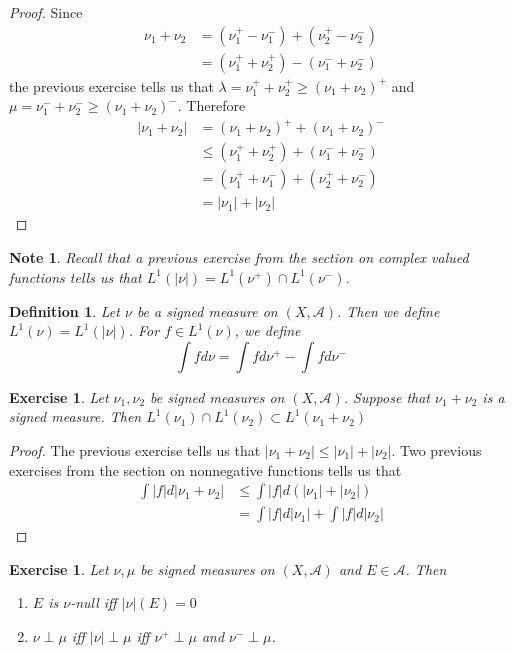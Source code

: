 \documentclass[12pt]{amsart}
\newtheorem{defn}[thm]{Definition}
\newtheorem{note}[thm]{Note}
\newtheorem{ex}[thm]{Exercise}
\newcommand{\lam}{\lambda}
\newcommand{\MA}{\mathcal{A}}
\begin{document}
\begin{proof}
Since 
\begin{align*}
\nu_1 + \nu_2 
&= (\nu_1^+ - \nu_1^-) + (\nu_2^+ - \nu_2^-)\\
&= (\nu_1^+ + \nu_2^+) - (\nu_1^- + \nu_2^-)
\end{align*}
the previous exercise tells us that $\lam = \nu_1^+ + \nu_2^+ \geq (\nu_1 + \nu_2)^+$ and $ \mu = \nu_1^- + \nu_2^- \geq (\nu_1 + \nu_2)^-$. Therefore 
\begin{align*}
|\nu_1 + \nu_2| 
&= (\nu_1 + \nu_2)^+  + (\nu_1 + \nu_2)^-\\
& \leq (\nu_1^+ + \nu_2^+) + (\nu_1^- + \nu_2^-)\\
&= (\nu_1^+ + \nu_1^-) + (\nu_2^+ + \nu_2^-)\\
&= |\nu_1| + |\nu_2|
\end{align*}
\end{proof}

\begin{note}
Recall that a previous exercise from the section on complex valued functions tells us that $L^1(|\nu|) = L^1(\nu^+) \cap L^1(\nu^-)$.
\end{note}

\begin{defn}
Let $\nu$ be a signed measure on $(X, \MA)$. Then we define $L^1(\nu) = L^1(|\nu|)$. For $f \in L^1(\nu)$, we define $$\int f d \nu = \int f d \nu^+ - \int f d\nu^-$$
\end{defn}

\begin{ex}
Let $\nu_1, \nu_2$ be signed measures on $(X, \MA)$. Suppose that $\nu_1 + \nu_2$ is a signed measure. Then 
$L^1(\nu_1)\cap L^1(\nu_2) \subset L^1(\nu_1 + \nu_2)$
\end{ex}

\begin{proof}
The previous exercise tells us that $|\nu_1 + \nu_2| \leq |\nu_1| + |\nu_2|$. Two previous exercises from the section on nonnegative functions tells us that 
\begin{align*}
\int |f|d |\nu_1 + \nu_2| 
& \leq \int |f| d(|\nu_1|+|\nu_2|)\\
&= \int |f|d |\nu_1| + \int |f| d|\nu_2|
\end{align*}
\end{proof}

\begin{ex}
Let $\nu, \mu$ be signed measures on $(X,\MA)$ and $E \in \MA$. Then 
\begin{enumerate}
\item $E$ is $\nu$-null iff $|\nu|(E) = 0$
\item $\nu \perp \mu$ iff $|\nu| \perp \mu$ iff $\nu^+ \perp \mu$ and $\nu^- \perp \mu$.
\end{enumerate}
\end{ex}
\end{document}
